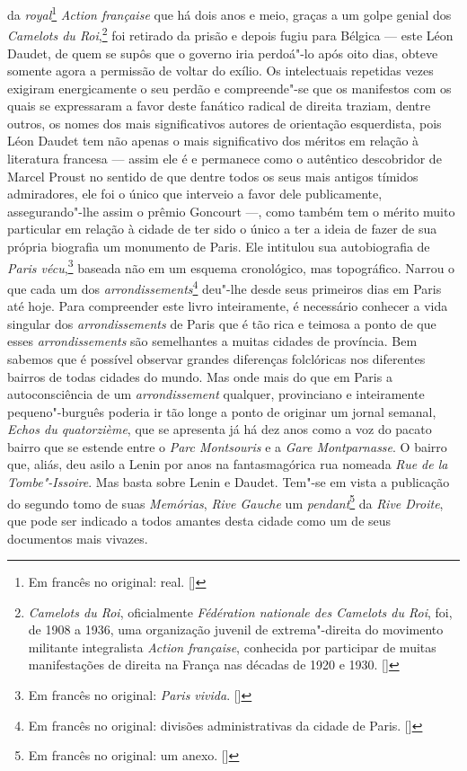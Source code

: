 da \emph{royal}\footnote{Em francês no original: real. []} \emph{Action française} que há dois anos e meio, graças a um golpe genial dos
\emph{Camelots du Roi},\footnote{\emph{Camelots du Roi},
  oficialmente \emph{Fédération nationale des Camelots du Roi}, foi, de 1908 a 1936, uma
  organização juvenil de extrema"-direita do movimento militante
  integralista \emph{Action française}, conhecida por
  participar de muitas manifestações de direita na França nas décadas de
  1920 e 1930. []} foi retirado da prisão e depois fugiu para Bélgica ---
este Léon Daudet, de quem se supôs que o governo iria perdoá"-lo após
oito dias, obteve somente agora a permissão de voltar do exílio. Os
intelectuais repetidas vezes exigiram energicamente o seu perdão e
compreende"-se que os manifestos com os quais se expressaram a favor
deste fanático radical de direita traziam, dentre outros, os nomes dos
mais significativos autores de orientação esquerdista, pois Léon Daudet
tem não apenas o mais significativo dos méritos em relação à literatura
francesa --- assim ele é e permanece como o autêntico descobridor de
Marcel Proust no sentido de que dentre todos os seus mais antigos
tímidos admiradores, ele foi o único que interveio a favor dele
publicamente, assegurando"-lhe assim o prêmio Goncourt ---, como também
tem o mérito muito particular em relação à cidade de ter sido o único a
ter a ideia de fazer de sua própria biografia um monumento de Paris. Ele
intitulou sua autobiografia de \emph{Paris vécu},\footnote{Em francês no original: \emph{Paris vivida}. []} baseada não em um esquema cronológico,
mas topográfico. Narrou o que cada um dos
\emph{arrondissements}\footnote{Em francês no original: divisões
  administrativas da cidade de Paris. []} deu"-lhe desde seus primeiros dias
em Paris até hoje. Para compreender este livro inteiramente, é
necessário conhecer a vida singular dos \emph{arrondissements} de Paris
que é tão rica e teimosa a ponto de que esses \emph{arrondissements} são semelhantes
a muitas cidades de província. Bem sabemos que é possível observar grandes
diferenças folclóricas nos diferentes bairros de todas cidades do mundo.
Mas onde mais do que em Paris a autoconsciência de um
\emph{arrondissement} qualquer, provinciano e inteiramente pequeno"-burguês poderia ir tão longe a ponto de originar um jornal semanal,
\emph{Echos du quatorzième}, que se apresenta já há dez anos como a voz
do pacato bairro que se estende entre o \emph{Parc Montsouris} e a
\emph{Gare Montparnasse}. O bairro que, aliás, deu asilo a Lenin por anos
na fantasmagórica rua nomeada \emph{Rue de la Tombe"-Issoire}. Mas basta
sobre Lenin e Daudet. Tem"-se em vista a publicação do segundo tomo de
suas \emph{Memórias}, \emph{Rive Gauche} um \emph{pendant}\footnote{Em francês no original: um anexo. []} da \emph{Rive Droite}, que pode ser
indicado a todos amantes desta cidade como um de seus documentos mais
vivazes.

